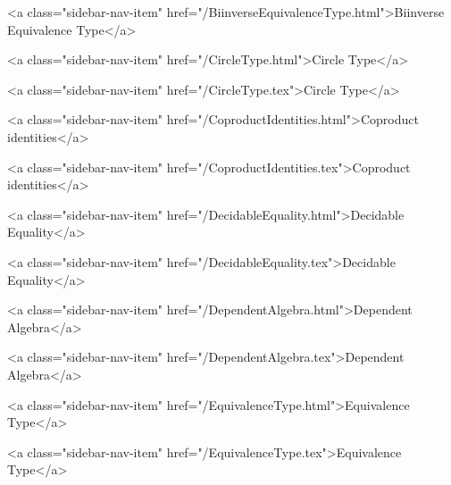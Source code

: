       
        
          <a class="sidebar-nav-item" href="/BiinverseEquivalenceType.html">Biinverse Equivalence Type</a>
        
      
    
      
        
          <a class="sidebar-nav-item" href="/CircleType.html">Circle Type</a>
        
      
    
      
        
          <a class="sidebar-nav-item" href="/CircleType.tex">Circle Type</a>
        
      
    
      
        
          <a class="sidebar-nav-item" href="/CoproductIdentities.html">Coproduct identities</a>
        
      
    
      
        
          <a class="sidebar-nav-item" href="/CoproductIdentities.tex">Coproduct identities</a>
        
      
    
      
        
          <a class="sidebar-nav-item" href="/DecidableEquality.html">Decidable Equality</a>
        
      
    
      
        
          <a class="sidebar-nav-item" href="/DecidableEquality.tex">Decidable Equality</a>
        
      
    
      
        
          <a class="sidebar-nav-item" href="/DependentAlgebra.html">Dependent Algebra</a>
        
      
    
      
        
          <a class="sidebar-nav-item" href="/DependentAlgebra.tex">Dependent Algebra</a>
        
      
    
      
        
          <a class="sidebar-nav-item" href="/EquivalenceType.html">Equivalence Type</a>
        
      
    
      
        
          <a class="sidebar-nav-item" href="/EquivalenceType.tex">Equivalence Type</a>
        

